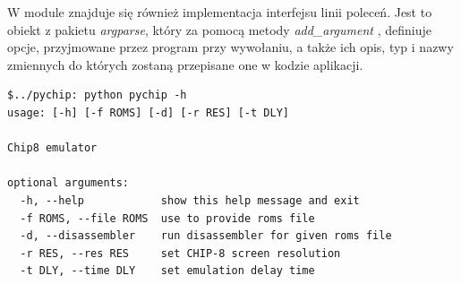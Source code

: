 W module znajduje się również implementacja interfejsu linii poleceń. Jest to obiekt z pakietu \textit{argparse}, który za pomocą metody \textit{add\_argument} \cite{Argparse}, definiuje opcje, przyjmowane przez program przy wywołaniu, a także ich opis, typ i nazwy zmiennych do których zostaną przepisane  one w kodzie aplikacji.

\begin{lstlisting}[caption={Wynik uruchomienia programu z opcją \textit{-h}},captionpos=b]
$../pychip: python pychip -h
usage: [-h] [-f ROMS] [-d] [-r RES] [-t DLY]

Chip8 emulator

optional arguments:
  -h, --help            show this help message and exit
  -f ROMS, --file ROMS  use to provide roms file
  -d, --disassembler    run disassembler for given roms file
  -r RES, --res RES     set CHIP-8 screen resolution
  -t DLY, --time DLY    set emulation delay time

\end{lstlisting}






